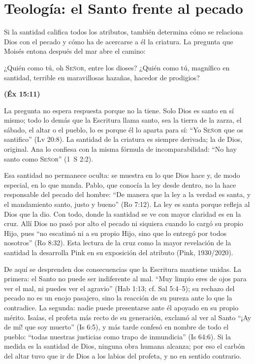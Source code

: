 \documentclass[11pt,letterpaper]{article}
\newcommand{\SENOR}{\textsc{Señor}}
\newcommand{\fuente}[1]{\par\hfill{\upshape\bfseries\small\textcolor{azul}{#1}}}
\begin{document}
\section{Teología: el Santo frente al pecado}

Si la santidad califica todos los atributos, también determina cómo se relaciona Dios con el pecado y cómo ha de acercarse a él la criatura. La pregunta que Moisés entona después del mar abre el camino:

\begin{cita}¿Quién como tú, oh \SENOR{}, entre los dioses? ¿Quién como tú, magnífico en santidad, terrible en maravillosas hazañas, hacedor de prodigios?\fuente{(Éx 15:11)}\end{cita}

La pregunta no espera respuesta porque no la tiene. Solo Dios es santo en sí mismo; todo lo demás que la Escritura llama santo, sea la tierra de la zarza, el sábado, el altar o el pueblo, lo es porque él lo aparta para sí: ``Yo \SENOR{} que os santifico'' (Lv 20:8). La santidad de la criatura es siempre derivada; la de Dios, original. Ana lo confiesa con la misma fórmula de incomparabilidad: ``No hay santo como \SENOR{}'' (1~S 2:2).

Esa santidad no permanece oculta: se muestra en lo que Dios hace y, de modo especial, en lo que manda. Pablo, que conocía la ley desde dentro, no la hace responsable del pecado del hombre: ``De manera que la ley a la verdad es santa, y el mandamiento santo, justo y bueno'' (Ro 7:12). La ley es santa porque refleja al Dios que la dio. Con todo, donde la santidad se ve con mayor claridad es en la cruz. Allí Dios no pasó por alto el pecado ni siquiera cuando lo cargó su propio Hijo, pues ``no escatimó ni a su propio Hijo, sino que lo entregó por todos nosotros'' (Ro 8:32). Esta lectura de la cruz como la mayor revelación de la santidad la desarrolla Pink en su exposición del atributo (Pink, 1930/2020).

De aquí se desprenden dos consecuencias que la Escritura mantiene unidas. La primera: el Santo no puede ser indiferente al mal. ``Muy limpio eres de ojos para ver el mal, ni puedes ver el agravio'' (Hab 1:13; cf. Sal 5:4--5); su rechazo del pecado no es un enojo pasajero, sino la reacción de su pureza ante lo que la contradice. La segunda: nadie puede presentarse ante él apoyado en su propio mérito. Isaías, el profeta más recto de su generación, exclamó al ver al Santo ``¡Ay de mí! que soy muerto'' (Is 6:5), y más tarde confesó en nombre de todo el pueblo: ``todas nuestras justicias como trapo de inmundicia'' (Is 64:6). Si la medida es la santidad de Dios, ninguna obra humana alcanza; por eso el carbón del altar tuvo que ir de Dios a los labios del profeta, y no en sentido contrario.
\end{document}
